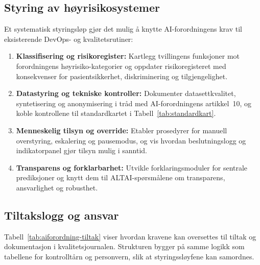 \subsection{Styring av høyrisikosystemer}
Et systematisk styringsløp gjør det mulig å knytte AI-forordningens krav til eksisterende DevOps- og kvalitetsrutiner:
\begin{enumerate}
    \item \textbf{Klassifisering og risikoregister:} Kartlegg tvillingens funksjoner mot forordningens høyrisiko-kategorier og oppdater risikoregisteret med konsekvenser for pasientsikkerhet, diskriminering og tilgjengelighet.\citep{eu2024aiact}
    \item \textbf{Datastyring og tekniske kontroller:} Dokumenter datasettkvalitet, syntetisering og anonymisering i tråd med AI-forordningens artikkel~10, og koble kontrollene til standardkartet i Tabell~\ref{tab:standardkart}.\citep{nist2023airmf}
    \item \textbf{Menneskelig tilsyn og override:} Etabler prosedyrer for manuell overstyring, eskalering og pausemodus, og vis hvordan beslutningslogg og indikatorpanel gjør tilsyn mulig i sanntid.\citep{digdir2023styringai}
    \item \textbf{Transparens og forklarbarhet:} Utvikle forklaringsmoduler for sentrale prediksjoner og knytt dem til ALTAI-spørsmålene om transparens, ansvarlighet og robusthet.\citep{ec2020trustworthyai}
\end{enumerate}

\subsection{Tiltakslogg og ansvar}
Tabell~\ref{tab:aiforordning-tiltak} viser hvordan kravene kan oversettes til tiltak og dokumentasjon i kvalitetsjournalen. Strukturen bygger på samme logikk som tabellene for kontrolltårn og personvern, slik at styringssløyfene kan samordnes.

